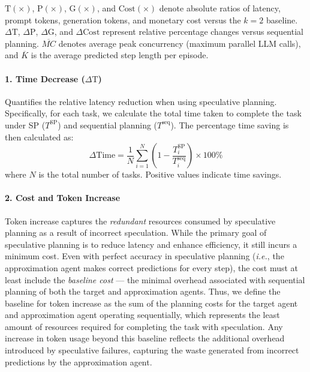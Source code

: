$\text{T}(\times)$, $\text{P}(\times)$, $\text{G}(\times)$, and $\text{Cost}(\times)$ denote absolute ratios of latency, prompt tokens, generation tokens, and monetary cost versus the $k=2$ baseline.
$\Delta \text{T}$, $\Delta \text{P}$, $\Delta \text{G}$, and $\Delta \text{Cost}$ represent relative percentage changes versus sequential planning.
$\overline{MC}$ denotes average peak concurrency (maximum parallel LLM calls), and $\overline{K}$ is the average predicted step length per episode.

\paragraph{1. Time Decrease ($\Delta {\text{T}}$)} 
Quantifies the relative latency reduction when using speculative planning. 
Specifically, for each task, we calculate the total time taken to complete the task under SP ($T^{\text{SP}}$) and sequential planning ($T^{\text{seq}}$). The percentage time saving is then calculated as:
\[
\Delta {\text{Time}} = \frac{1}{N} \sum_{i=1}^N \left(1 - \frac{T^{\text{SP}}_i}{T^{\text{seq}}_i}\right) \times 100\%
\]
where $N$ is the total number of tasks. Positive values indicate time savings.

\paragraph{2. Cost and Token Increase}

Token increase captures the \emph{redundant} resources consumed by speculative planning as a result of incorrect speculation. While the primary goal of speculative planning is to reduce latency and enhance efficiency, it still incurs a minimum cost. Even with perfect accuracy in speculative planning (\emph{i.e.}, the approximation agent makes correct predictions for every step), the cost must at least include the \emph{baseline cost} — the minimal overhead associated with sequential planning of both the target and approximation agents. Thus, we define the baseline for token increase as the sum of the planning costs for the target agent and approximation agent operating sequentially, which represents the least amount of resources required for completing the task with speculation. Any increase in token usage beyond this baseline reflects the additional overhead introduced by speculative failures, capturing the waste generated from incorrect predictions by the approximation agent.

